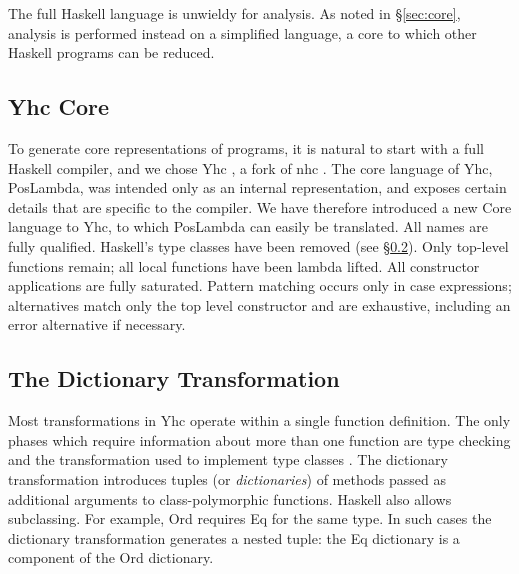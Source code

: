 \documentclass[preprint]{sigplanconf}
\let\cite=\citep
\newcommand{\C}[1]{\textsf{#1}}
\begin{document}
The full Haskell language is unwieldy for analysis. As noted in \S\ref{sec:core}, analysis is performed instead on a simplified language, a core to which other Haskell programs can be reduced.

\subsection{Yhc Core}

\begin{comment}
-- a simple variant of lambda calculus without types, but with source position information. Yhc works by applying basic desugaring transformations, without optimisation. This simplicity ensures the generated PosLambda is close to the original Haskell in its structure. Each top-level function in a source file maps to a top-level function in the generated PosLambda, retaining the same name.

However, PosLambda has constructs that have no direct representation in Haskell. For example, there is a FatBar construct \cite{spj:implementation}, used for compiling pattern matches which require fall through behaviour. The PosLambda language
\end{comment}

To generate core representations of programs, it is natural to start with a full Haskell compiler, and we chose Yhc \citep{Yhc}, a fork of nhc \citep{nhc}. The core language of Yhc, PosLambda, was intended only as an internal representation, and exposes certain details that are specific to the compiler. We have therefore introduced a new Core language to Yhc, to which PosLambda can easily be translated. All names are fully qualified. Haskell's type classes have been removed (see \S\ref{sec:dict}). Only top-level functions remain; all local functions have been lambda lifted. All constructor applications are fully saturated. Pattern matching occurs only in case expressions; alternatives match only the top level constructor and are exhaustive, including an \C{error} alternative if necessary.


\subsection{The Dictionary Transformation}
\label{sec:dict}

Most transformations in Yhc operate within a single function definition. The only phases which require information about more than one function are type checking and the transformation used to implement type classes \citep{wadler:type_classes}. The dictionary transformation introduces tuples (or \textit{dictionaries}) of methods passed as additional arguments to class-polymorphic functions. Haskell also allows subclassing. For example, \C{Ord} requires \C{Eq} for the same type. In such cases the dictionary transformation generates a nested tuple: the \C{Eq} dictionary is a component of the \C{Ord} dictionary.
\end{document}
